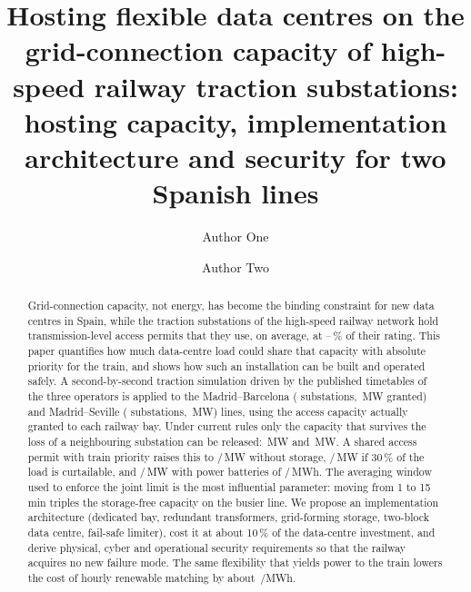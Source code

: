 \documentclass[preprint,review,12pt]{elsarticle}
\begin{document}
\begin{frontmatter}

\title{Hosting flexible data centres on the grid-connection capacity of high-speed railway traction substations: hosting capacity, implementation architecture and security for two Spanish lines}

\author[a]{Author One}
\author[b]{Author Two}

\begin{abstract}
Grid-connection capacity, not energy, has become the binding constraint for new data centres in Spain, while the traction substations of the high-speed railway network hold transmission-level access permits that they use, on average, at \msUsePct--\mzbUsePct\,\% of their rating. This paper quantifies how much data-centre load could share that capacity with absolute priority for the train, and shows how such an installation can be built and operated safely. A second-by-second traction simulation driven by the published timetables of the three operators is applied to the Madrid--Barcelona (\mzbSubs{} substations, \mzbAccess\,MW granted) and Madrid--Seville (\msSubs{} substations, \msAccess\,MW) lines, using the access capacity actually granted to each railway bay. Under current rules only the capacity that survives the loss of a neighbouring substation can be released: \mzbFirm\,MW and \msFirm\,MW. A shared access permit with train priority raises this to \mzbNoBat/\msNoBat\,MW without storage, \mzbFlex/\msFlex\,MW if 30\,\% of the load is curtailable, and \mzbBat/\msBat\,MW with power batteries of \mzbBatMWh/\msBatMWh\,MWh. The averaging window used to enforce the joint limit is the most influential parameter: moving from 1 to 15\,min triples the storage-free capacity on the busier line. We propose an implementation architecture (dedicated bay, redundant transformers, grid-forming storage, two-block data centre, fail-safe limiter), cost it at about 10\,\% of the data-centre investment, and derive physical, cyber and operational security requirements so that the railway acquires no new failure mode. The same flexibility that yields power to the train lowers the cost of hourly renewable matching by about \resFlexValue\,\texteuro/MWh.
\end{abstract}


\end{frontmatter}
\end{document}
